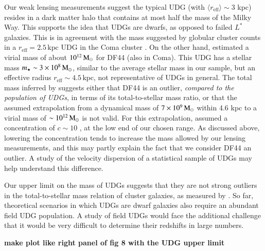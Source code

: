 \documentclass[usenatbib,fleqn]{mnras}
\def\reff{r_\mathrm{eff}}
\begin{document}
Our weak lensing measurements suggest the typical UDG (with $\langle\reff\rangle\sim3$ kpc) resides in a dark matter halo that contains at most half the mass of the Milky Way. This supports the idea that UDGs are dwarfs, as opposed to failed $L^*$ galaxies. This is in agreement with the mass suggested by globular cluster counts in a $\reff=2.5\,\mathrm{kpc}$ UDG in the Coma cluster \citep{beasley16_acs,peng16}. On the other hand, \cite{vandokkum16} estimated a virial mass of about $10^{12}\,\mathrm{M}_\odot$ for DF44 (also in Coma). This UDG has a stellar mass $m_\star\sim3\times10^8\,\mathrm{M}_\odot$, similar to the average stellar mass in our sample, but an effective radius $\reff\sim4.5\,\mathrm{kpc}$, not representative of UDGs in general. The total mass inferred by \cite{vandokkum16} suggests either that DF44 is an outlier, \emph{compared to the population of UDGs}, in terms of its total-to-stellar mass ratio, or that the assumed extrapolation from a dynamical mass of $7\times10^9\,\mathrm{M}_\odot$ within 4.6 kpc to a virial mass of $\sim10^{12}\,\mathrm{M}_\odot$ is not valid. For this extrapolation, \cite{vandokkum16} assumed a concentration of $c\sim10$ \citep{maccio08}, at the low end of our chosen range. As discussed above, lowering the concentration tends to increase the mass allowed by our lensing measurements, and this may partly explain the fact that we consider DF44 an outlier. A study of the velocity dispersion of a statistical sample of UDGs may help understand this difference.

Our upper limit on the mass of UDGs suggests that they are not strong outliers in the total-to-stellar mass relation of cluster galaxies, as measured by \cite{sifon17}. So far, theoretical scenarios in which UDGs are dwarf galaxies also require an abundant field UDG population. A study of field UDGs would face the additional challenge that it would be very difficult to determine their redshifts in large numbers.

\textbf{make plot like right panel of fig 8 with the UDG upper limit}





\end{document}
